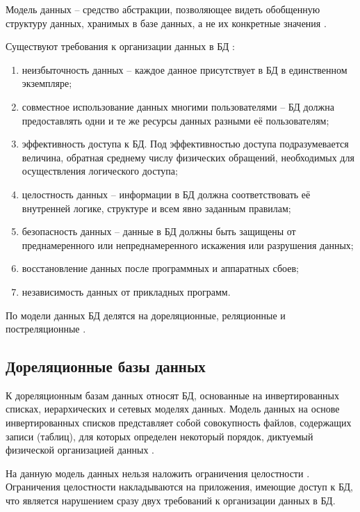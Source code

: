 Модель данных -- средство абстракции, позволяющее видеть обобщенную структуру данных, хранимых в базе данных, а не их конкретные значения \cite{dm}.

Существуют требования к организации данных в БД \cite{bd:2023}:
\begin{enumerate}
	\item неизбыточность данных -- каждое данное присутствует в БД в единственном экземпляре;
	\item совместное использование данных многими пользователями -- БД должна предоставлять одни и те же ресурсы данных разными её пользователям;
	\item эффективность доступа к БД. Под эффективностью доступа подразумевается величина, обратная среднему числу физических обращений, необходимых для осуществления логического доступа;
	\item целостность данных -- информации в БД должна соответствовать её внутренней логике, структуре и всем явно заданным правилам;
	\item безопасность данных -- данные в БД должны быть защищены от преднамеренного или непреднамеренного искажения или разрушения данных;
	\item восстановление данных после программных и аппаратных сбоев;
	\item независимость данных от прикладных программ.
\end{enumerate}

По модели данных БД делятся на дореляционные, реляционные и постреляционные \cite{bd:2023}.

\subsection{Дореляционные базы данных}

К дореляционным базам данных относят БД, основанные на инвертированных списках, иерархических и сетевых моделях данных.
Модель данных на основе инвертированных списков представляет собой совокупность файлов, содержащих записи (таблиц), для которых определен некоторый порядок, диктуемый физической организацией данных \cite{bd:2023}.


На данную модель данных нельзя наложить ограничения целостности \cite{bd:2023}. Ограничения целостности накладываются на приложения, имеющие доступ к БД, что является нарушением сразу двух требований к организации данных в БД.

